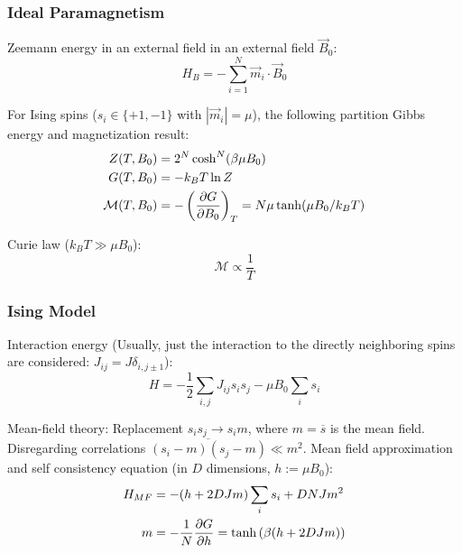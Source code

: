 		\subsubsection{Ideal Paramagnetism}
			\noindent
			Zeemann energy in an external field in an external field $\vec{B}_0$:
			\begin{equation}
				H_B = -\sum_{i=1}^N \vec{m}_i \cdot \vec{B}_0
			\end{equation}

			\noindent
			For Ising spins ($s_i\in\lbrace +1, -1\rbrace$ with $|\vec{m}_i| = \mu$), the following partition Gibbs energy and magnetization result:
			\begin{equation}
				\begin{aligned}
					Z(T,B_0) &= 2^N \cosh^N (\beta\mu B_0) \\
					G(T,B_0) &= -k_B T \ln Z \\
					\mathcal{M}(T,B_0) &= -\left(\frac{\partial G}{\partial B_0}\right)_T = N\mu \tanh(\mu B_0 /k_B T)
				\end{aligned}
			\end{equation}

			\noindent
			Curie law ($k_B T \gg \mu B_0$):
			\begin{equation}
				\mathcal{M} \propto \frac{1}{T}
			\end{equation}

		\subsubsection{Ising Model}
			\noindent
			Interaction energy (Usually, just the interaction to the directly neighboring spins are considered: $J_{ij} = J \delta_{i,j\pm 1}$):
			\begin{equation}
				H = -\frac{1}{2}\sum_{i,j} J_{ij} s_i s_j -\mu B_0 \sum_i s_i
			\end{equation}

			\noindent
			Mean-field theory: \newline
			Replacement $s_i s_j \rightarrow s_i m$, where $m = \overline{s}$ is the mean field. Disregarding correlations $\overline{(s_i-m)(s_j-m)}\ll m^2$. \nl
			Mean field approximation and self consistency equation (in $D$ dimensions, $h:=\mu B_0$):
			\begin{equation}
				\begin{aligned}
					H_{MF} &= -(h + 2 D J m) \sum_i s_i + D N J m^2 \\
					m &= -\frac{1}{N}\frac{\partial G}{\partial h} = \tanh\left({\beta(h + 2 D J m)}\right)
				\end{aligned}
			\end{equation}
